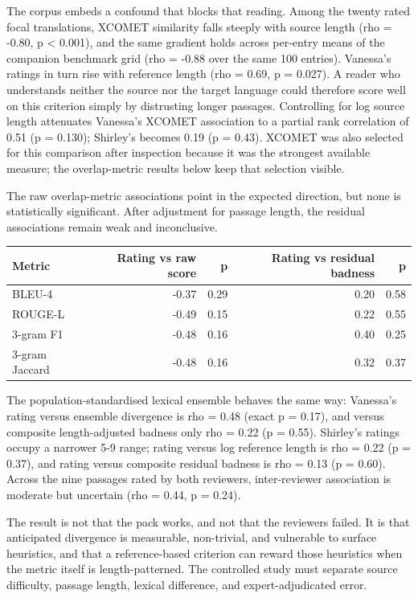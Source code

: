 \documentclass[
  12pt,
]{article}
\begin{document}
The corpus embeds a confound that blocks that reading. Among the twenty
rated focal translations, XCOMET similarity falls steeply with source
length (rho = -0.80, p \textless{} 0.001), and the same gradient holds
across per-entry means of the companion benchmark grid (rho = -0.88 over
the same 100 entries). Vanessa's ratings in turn rise with reference
length (rho = 0.69, p = 0.027). A reader who understands neither the
source nor the target language could therefore score well on this
criterion simply by distrusting longer passages. Controlling for log
source length attenuates Vanessa's XCOMET association to a partial rank
correlation of 0.51 (p = 0.130); Shirley's becomes 0.19 (p = 0.43).
XCOMET was also selected for this comparison after inspection because it
was the strongest available measure; the overlap-metric results below
keep that selection visible.

The raw overlap-metric associations point in the expected direction, but
none is statistically significant. After adjustment for passage length,
the residual associations remain weak and inconclusive.

\begin{longtable}[]{@{}lrrrr@{}}
\toprule\noalign{}
Metric & Rating vs raw score & p & Rating vs residual badness & p \\
\midrule\noalign{}
\endhead
\bottomrule\noalign{}
\endlastfoot
BLEU-4 & -0.37 & 0.29 & 0.20 & 0.58 \\
ROUGE-L & -0.49 & 0.15 & 0.22 & 0.55 \\
3-gram F1 & -0.48 & 0.16 & 0.40 & 0.25 \\
3-gram Jaccard & -0.48 & 0.16 & 0.32 & 0.37 \\
\end{longtable}

The population-standardised lexical ensemble behaves the same way:
Vanessa's rating versus ensemble divergence is rho = 0.48 (exact p =
0.17), and versus composite length-adjusted badness only rho = 0.22 (p =
0.55). Shirley's ratings occupy a narrower 5-9 range; rating versus log
reference length is rho = 0.22 (p = 0.37), and rating versus composite
residual badness is rho = 0.13 (p = 0.60). Across the nine passages
rated by both reviewers, inter-reviewer association is moderate but
uncertain (rho = 0.44, p = 0.24).

The result is not that the pack works, and not that the reviewers
failed. It is that anticipated divergence is measurable, non-trivial,
and vulnerable to surface heuristics, and that a reference-based
criterion can reward those heuristics when the metric itself is
length-patterned. The controlled study must separate source difficulty,
passage length, lexical difference, and expert-adjudicated error.
\end{document}
